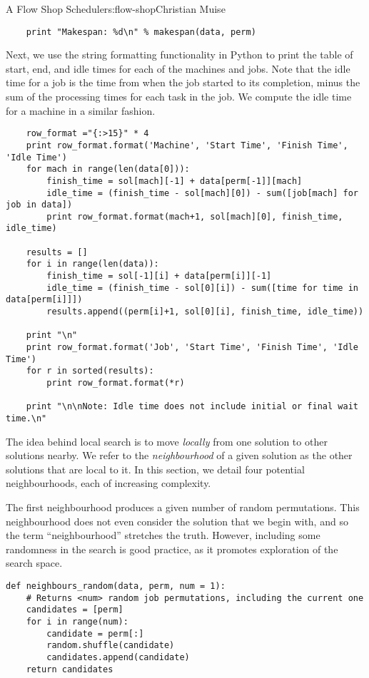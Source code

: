 \begin{aosachapter}{A Flow Shop Scheduler}{s:flow-shop}{Christian Muise}
\begin{verbatim}
    print "Makespan: %d\n" % makespan(data, perm)
\end{verbatim}

Next, we use the string formatting functionality in Python to print the
table of start, end, and idle times for each of the machines and jobs.
Note that the idle time for a job is the time from when the job started
to its completion, minus the sum of the processing times for each task
in the job. We compute the idle time for a machine in a similar fashion.

\begin{verbatim}
    row_format ="{:>15}" * 4
    print row_format.format('Machine', 'Start Time', 'Finish Time', 'Idle Time')
    for mach in range(len(data[0])):
        finish_time = sol[mach][-1] + data[perm[-1]][mach]
        idle_time = (finish_time - sol[mach][0]) - sum([job[mach] for job in data])
        print row_format.format(mach+1, sol[mach][0], finish_time, idle_time)

    results = []
    for i in range(len(data)):
        finish_time = sol[-1][i] + data[perm[i]][-1]
        idle_time = (finish_time - sol[0][i]) - sum([time for time in data[perm[i]]])
        results.append((perm[i]+1, sol[0][i], finish_time, idle_time))

    print "\n"
    print row_format.format('Job', 'Start Time', 'Finish Time', 'Idle Time')
    for r in sorted(results):
        print row_format.format(*r)

    print "\n\nNote: Idle time does not include initial or final wait time.\n"
\end{verbatim}

\label{neighbourhoods}

The idea behind local search is to move \emph{locally} from one solution
to other solutions nearby. We refer to the \emph{neighbourhood} of a
given solution as the other solutions that are local to it. In this
section, we detail four potential neighbourhoods, each of increasing
complexity.

The first neighbourhood produces a given number of random permutations.
This neighbourhood does not even consider the solution that we begin
with, and so the term ``neighbourhood'' stretches the truth. However,
including some randomness in the search is good practice, as it promotes
exploration of the search space.

\begin{verbatim}
def neighbours_random(data, perm, num = 1):
    # Returns <num> random job permutations, including the current one
    candidates = [perm]
    for i in range(num):
        candidate = perm[:]
        random.shuffle(candidate)
        candidates.append(candidate)
    return candidates
\end{verbatim}


\end{aosachapter}
